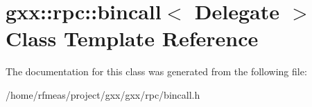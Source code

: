 \hypertarget{classgxx_1_1rpc_1_1bincall}{}\section{gxx\+:\+:rpc\+:\+:bincall$<$ Delegate $>$ Class Template Reference}
\label{classgxx_1_1rpc_1_1bincall}


The documentation for this class was generated from the following file\+:\begin{DoxyCompactItemize}
\item 
/home/rfmeas/project/gxx/gxx/rpc/bincall.\+h\end{DoxyCompactItemize}
